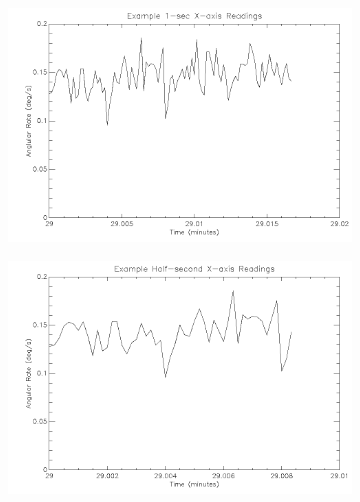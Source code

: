 \begin{figure}[htbp]
\captionsetup[subfigure]{justification=centering}
\captionsetup{justification=centering}
    \centering
	\begin{subfigure}{0.45\textwidth}
		\includegraphics[width=1\linewidth]{appendix/img/campaign_results/gyrox1sec.png}
		\caption{}
		\label{fig:sub:gyrox1}
	\end{subfigure}
	\begin{subfigure}{0.45\textwidth}
		\includegraphics[width=1\linewidth]{appendix/img/campaign_results/gyroxhalfsec.png}
		\caption{}
		\label{fig:sub:gyroxh}
	\end{subfigure}
	\begin{subfigure}{0.45\textwidth}

\end{subfigure}
\end{figure}
